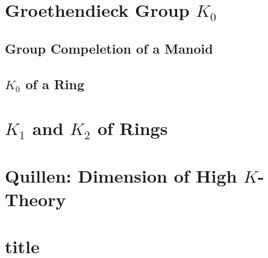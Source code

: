 \documentclass[Total.tex]{subfiles}
\begin{document}
	\chapter{Groethendieck Group $K_0$}
		\section{Group Compeletion of a Manoid}
		\section{$K_0$ of a Ring}
	
	\chapter{$K_1$ and $K_2$ of Rings}
	
	\chapter{Quillen: Dimension of High $K$-Theory}
	
	\chapter{title}
\end{document}

